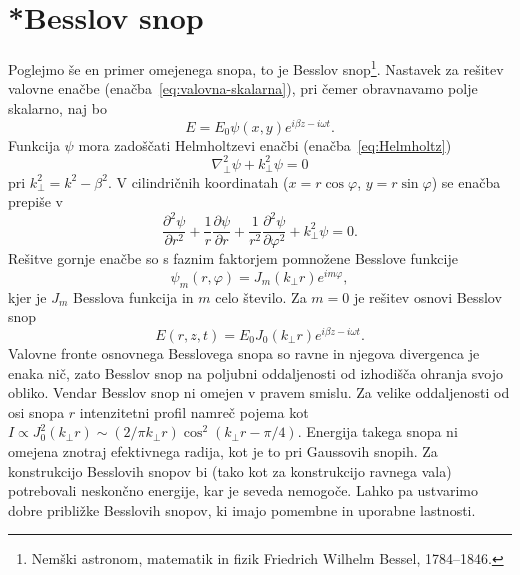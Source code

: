 \section{*Besslov snop}

Poglejmo še en primer omejenega snopa, to je Besslov
snop\footnote{Nemški astronom, matematik in fizik Friedrich Wilhelm Bessel, 1784--1846.}. 
Nastavek za rešitev valovne enačbe (enačba~\ref{eq:valovna-skalarna}), 
pri čemer obravnavamo polje skalarno, naj bo
\begin{equation}
E=E_{0}\psi(x,y)e^{i\beta z-i\omega t}.
\end{equation}
Funkcija $\psi$ mora zadoščati Helmholtzevi enačbi
(enačba~\ref{eq:Helmholtz})
\begin{equation}
\nabla_{\perp}^{2}\psi+k_{\perp}^{2}\psi=0
\end{equation}
pri $k_{\perp}^{2}=k^{2}-\beta^{2}$. V cilindričnih
koordinatah ($x=r\cos\varphi$, $y=r\sin\varphi$) se enačba prepiše v 
\begin{equation}
\frac{\partial^2 \psi}{\partial r^2}+ \frac{1}{r}\frac{\partial \psi}{\partial r}
+ \frac{1}{r^2}\frac{\partial^2 \psi}{\partial \varphi^2}+k_{\perp}^{2}\psi=0.
\end{equation}
Rešitve gornje enačbe so s faznim faktorjem pomnožene Besslove funkcije
\begin{equation}
\psi_m(r, \varphi)=J_{m}(k_{\perp}r)e^{im\varphi},
\end{equation}
kjer je $J_{m}$ Besslova funkcija in $m$ celo število. Za
$m=0$ je rešitev osnovi Besslov snop
\begin{equation}
E(r,z,t)=E_{0}J_{0}(k_{\perp}r)e^{i\beta z-i \omega t}.
\label{eq:Besslov-snop}
\end{equation}
Valovne fronte osnovnega Besslovega snopa so ravne
 in njegova divergenca je enaka nič, zato Besslov snop na
poljubni oddaljenosti od izhodišča ohranja svojo obliko. Vendar Besslov snop ni 
omejen v pravem smislu. Za velike oddaljenosti od osi snopa $r$ intenzitetni profil 
namreč pojema kot $I \propto J_{0}^{2}(k_{\perp}r)\sim (2/\pi k_{\perp}r)\cos^{2}(k_{\perp}r-\pi/4)$.
Energija takega snopa ni omejena znotraj efektivnega radija,
kot je to pri Gaussovih snopih. Za konstrukcijo Besslovih snopov
bi (tako kot za konstrukcijo ravnega vala) potrebovali neskončno energije,
kar je seveda nemogoče. Lahko pa ustvarimo dobre približke Besslovih 
snopov, ki imajo pomembne in uporabne lastnosti. 


